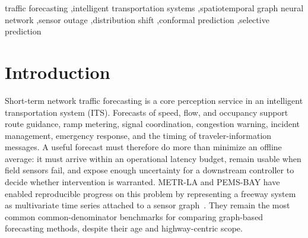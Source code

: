 \documentclass[preprint,12pt]{elsarticle}
\begin{document}
\begin{frontmatter}
\begin{abstract}
belongs to the recipe rather than to ShiftGuard's architecture. Of four registered hypotheses,
evidence gating lowered blind-sensor error, left fresh-sensor error unchanged,
and improved blind-sensor coverage, but abstaining to a historical fallback did
not lower MAE. When the risk certificate is limited to origins with non-overlapping
targets, it certifies only 22\% of daily blocks on METR-LA. An audit of our earlier
window-level stress protocol found defects, so those results are reported only
as a labelled legacy comparison. On METR-LA's own missing data, average accuracy
is close to STAEformer's, but ShiftGuard reduces error on silent sensors by
10--22\% and keeps interval coverage near 90\% in every missingness stratum;
neither model meets the risk target during rare network-wide dropouts.
ShiftGuard is not a clean-data state of the art: it is
0.03 mph more accurate than STAEformer on clean METR-LA and 0.013 mph less
accurate on PEMS-BAY.
\end{abstract}

\begin{keyword}
traffic forecasting \sep intelligent transportation systems \sep spatiotemporal
graph neural network \sep sensor outage \sep distribution shift \sep conformal
prediction \sep selective prediction
\end{keyword}
\end{frontmatter}

\section{Introduction}
Short-term network traffic forecasting is a core perception service in an
intelligent transportation system (ITS). Forecasts of speed, flow, and
occupancy support route guidance, ramp metering, signal coordination,
congestion warning, incident management, emergency response, and the timing of
traveler-information messages. A useful forecast must therefore do more than
minimize an offline average: it must arrive within an operational latency
budget, remain usable when field sensors fail, and expose enough uncertainty
for a downstream controller to decide whether intervention is warranted.
METR-LA and PEMS-BAY have enabled reproducible progress on this problem by
representing a freeway system as multivariate time series attached to a sensor
graph~\cite{li2018dcrnn}. They remain the most common common-denominator
benchmarks for comparing graph-based forecasting methods, despite their age
and highway-centric scope.
\end{document}
